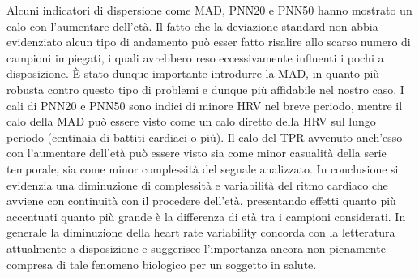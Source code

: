 \documentclass[a4paper, 12pt]{book}
\begin{document}
Alcuni indicatori di dispersione come MAD, PNN20 e PNN50 hanno mostrato un calo con l'aumentare dell'età.
Il fatto che la deviazione standard non abbia evidenziato alcun tipo di andamento può esser fatto risalire allo scarso numero di campioni impiegati, i quali avrebbero reso eccessivamente influenti i pochi a disposizione.
È stato dunque importante introdurre la MAD, in quanto più robusta contro questo tipo di problemi e dunque più affidabile nel nostro caso.
I cali di PNN20 e PNN50 sono indici di minore HRV nel breve periodo, mentre il calo della MAD può essere visto come un calo diretto della HRV sul lungo periodo (centinaia di battiti cardiaci o più).
Il calo del TPR avvenuto anch'esso con l'aumentare dell'età può essere visto sia come minor casualità della serie temporale, sia come minor complessità del segnale analizzato.
In conclusione si evidenzia una diminuzione di complessità e variabilità del ritmo cardiaco che avviene con continuità con il procedere dell'età, presentando effetti quanto più accentuati quanto più grande è la differenza di età tra i campioni considerati.
In generale la diminuzione della heart rate variability concorda con la letteratura attualmente a disposizione e suggerisce l'importanza ancora non pienamente compresa di tale fenomeno biologico per un soggetto in salute.



\thispagestyle{empty}
\newpage
\thispagestyle{empty}





\end{document}
